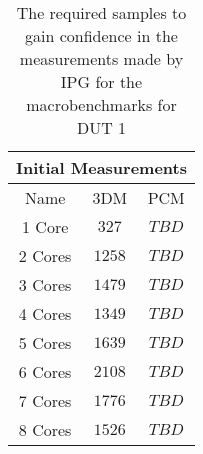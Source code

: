 \begin{table}[H]
    \centering
    \begin{tabular}{|| c | c | c ||}
    \hline
    \multicolumn{3}{||c||}{Initial Measurements} \\ [0.5ex] \hline\hline
    Name & 3DM & PCM \\\hline
    1 Core & $327$ & $TBD$ \\
    2 Cores & $1258$ & $TBD$ \\
    3 Cores & $1479$ & $TBD$ \\
    4 Cores & $1349$ & $TBD$ \\
    5 Cores & $1639$ & $TBD$ \\
    6 Cores & $2108$ & $TBD$ \\
    7 Cores & $1776$ & $TBD$ \\
    8 Cores & $1526$ & $TBD$ \\\hline
    \end{tabular}
    \caption{The required samples to gain confidence in the measurements made by IPG for the macrobenchmarks for DUT 1}
    \label{tab:initial-measurements-exp-3-dut-1-app}
\end{table}